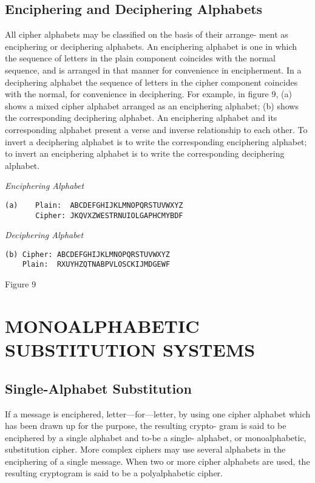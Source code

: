 \subsection{Enciphering and Deciphering Alphabets}

All cipher alphabets may be classiﬁed on the basis of their arrange-
ment as enciphering or deciphering alphabets. An enciphering alphabet is
one in which the sequence of letters in the plain component coincides with
the normal sequence, and is arranged in that manner for convenience
in encipherment. In a deciphering alphabet the sequence of letters in the
cipher component coincides with the normal, for convenience in deciphering. For example, in ﬁgure 9, (a) shows a mixed cipher alphabet
arranged as an enciphering alphabet; (b) shows the corresponding
deciphering alphabet. An enciphering alphabet and its corresponding
alphabet present a verse and inverse relationship to each other. To invert
a deciphering alphabet is to write the corresponding enciphering alphabet;
to invert an enciphering alphabet is to write the corresponding deciphering alphabet.

\begin{textfigure}
\textit{Enciphering Alphabet}

        \begin{verbatim}
(a)    Plain:  ABCDEFGHIJKLMNOPQRSTUVWXYZ
       Cipher: JKQVXZWESTRNUIOLGAPHCMYBDF
        \end{verbatim}

        \textit{Deciphering Alphabet}

        \begin{verbatim}
(b) Cipher: ABCDEFGHIJKLMNOPQRSTUVWXYZ
    Plain:  RXUYHZQTNABPVLOSCKIJMDGEWF
        \end{verbatim}
        \caption{Figure 9}
\end{textfigure}

\section{MONOALPHABETIC SUBSTITUTION SYSTEMS}

\subsection{Single-Alphabet Substitution}

If a message is enciphered, letter—for—letter, by using one cipher
alphabet which has been drawn up for the purpose, the resulting crypto-
gram is said to be enciphered by a single alphabet and to-be a single-
alphabet, or monoalphabetic, substitution cipher. More complex ciphers
may use several alphabets in the enciphering of a single message. When
two or more cipher alphabets are used, the resulting cryptogram is said
to be a polyalphabetic cipher.

